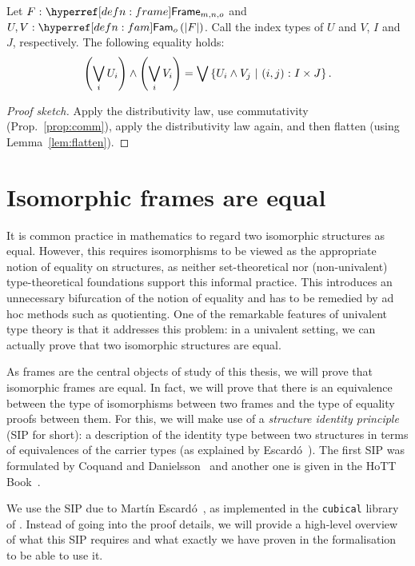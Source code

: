 \begin{prop}\label{prop:distr}
  Let $\oftyI{F}{\framety{m}{n}{o}}$ and $\oftyII{U}{V}{\sub{o}{\abs{F}}}$. Call the index
  types of $U$ and $V$, $I$ and $J$, respectively. The following equality holds:
  \begin{equation*}
      \left( \bigvee_i U_i \right) \wedge \left( \bigvee_i V_i \right)
    = \bigvee \left\{  U_i \wedge V_j ~|~ (i, j)\hspace{0.1mm}:\hspace{0.1mm}I \times J  \right\}.
  \end{equation*}
\end{prop}
\begin{proof}[Proof sketch]
  Apply the distributivity law, use commutativity (Prop.~\ref{prop:comm}), apply the
  distributivity law again, and then flatten (using Lemma~\ref{lem:flatten}).
\end{proof}

\section{Isomorphic frames are equal}\label{sec:frame-univ}

It is common practice in mathematics to regard two isomorphic structures as equal.
However, this requires isomorphisms to be viewed as the appropriate notion of equality on
structures, as neither set-theoretical nor (non-univalent) type-theoretical foundations
support this informal practice. This introduces an unnecessary bifurcation of the notion
of equality and has to be remedied by ad hoc methods such as quotienting. One of the
remarkable features of univalent type theory is that it addresses this problem: in a
univalent setting, we can actually prove that two isomorphic structures are equal.

As frames are the central objects of study of this thesis, we will prove that isomorphic
frames are equal. In fact, we will prove that there is an equivalence between the type of
isomorphisms between two frames and the type of equality proofs between them. For this, we
will make use of a \emph{structure identity principle} (SIP for short): a description of
the identity type between two structures in terms of equivalences of the carrier types (as
explained by Escardó~\cite{escardo-uf-intro}). The first SIP was formulated by Coquand and
Danielsson~\cite{coq-nad} and another one is given in the HoTT Book~\cite{hottbook}.

We use the SIP due to Martín Escardó~\cite{escardo-uf-intro}, as implemented in the
\texttt{cubical} library~\cite{agda-cubical} of \veragda{}. Instead of going into the
proof details, we will provide a high-level overview of what this SIP requires and what
exactly we have proven in the \veragda{} formalisation to be able to use it.

